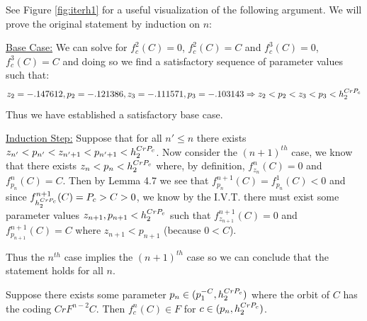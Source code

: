 		\begin{myproof}
			See Figure \ref{fig:iterh1} for a useful visualization of the following argument. We will prove the original statement by induction on $n$:

			\underline{Base Case:} We can solve for $f^2_c (C) = 0$, $f^2_c (C) = C$ and $f^3_c (C) = 0$, $f^3_c (C) = C$ and doing so we find a satisfactory sequence of parameter values such that:
			\[
				z_2 = -.147612, p_2 = -.121386, z_3 = -.111571, p_3 = -.103143 \Rightarrow z_2 < p_2 < z_3 < p_3 < h^{CrP_c}_2
			\]
			Thus we have established a satisfactory base case.

			\underline{Induction Step:} Suppose that for all $n' \leq n$ there exists $z_{n'} < p_{n'} < z_{n' + 1} < p_{n' + 1} < h^{CrP_c}_2$. Now consider the $ (n + 1)^{th}$ case, we know that there exists $z_n < p_n < h^{CrP_c}_2$ where, by definition, $f^n_{z_n} (C) = 0$ and $f^n_{p_n} (C) = C$. Then by Lemma 4.7 we see that $f^{n+1}_{p_n} (C) = f_{p_n}^{1} (C) < 0$ and since $f^{n+1}_{h^{CrP_c}_2} (C) = P_c > C > 0$, we know by the I.V.T. there must exist some parameter values $z_{n+1}, p_{n+1} < h^{CrP_c}_2$ such that $f^{n+1}_{z_{n+1}} (C) = 0$ and $f^{n+1}_{p_{n+1}} (C) = C$ where $z_{n+1} < p_{n+1}$ (because $0 < C$).

			Thus the $n^{th}$ case implies the $ (n+1)^{th}$ case so we can conclude that the statement holds for all $n$.
		\end{myproof}

		\begin{mylemma} \label{inf}
			Suppose there exists some parameter $p_n \in (p^{-C}_1, h^{CrP_c}_2)$ where the orbit of $C$ has the coding $CrF^{n-2}C$. Then $f^n_c (C) \in F$ for $c\in (p_n, h^{CrP_c}_2)$.
		\end{mylemma}

